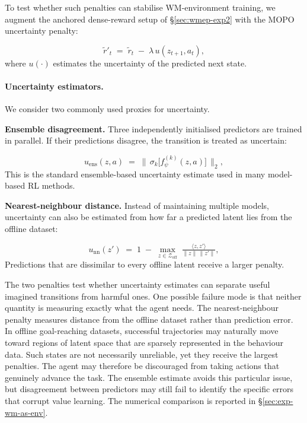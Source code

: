 To test whether such penalties can stabilise WM-environment training,
we augment the anchored dense-reward setup of
\S\ref{sec:wmep-exp2} with the MOPO uncertainty penalty:

\begin{equation}
    \tilde r'_t \;=\; \tilde r_t \;-\; \lambda\, u(z_{t+1}, a_t),
    \label{eq:wmep-mopo-reward}
\end{equation}
where $u(\cdot)$ estimates the uncertainty of the predicted next state.

\paragraph{Uncertainty estimators.}

We consider two commonly used proxies for uncertainty.

\textbf{Ensemble disagreement.}
Three independently initialised predictors are trained in parallel. If
their predictions disagree, the transition is treated as uncertain:

\begin{equation}
    u_{\text{ens}}(z, a) \;=\; \Big\|\,\sigma_k\!\big[f_\psi^{(k)}(z, a)\big]\,\Big\|_2,
    \label{eq:wmep-mopo-ens}
\end{equation}
This is the standard ensemble-based uncertainty estimate used in many
model-based RL methods.

\medskip

\textbf{Nearest-neighbour distance.}
Instead of maintaining multiple models, uncertainty can also be
estimated from how far a predicted latent lies from the offline
dataset:

\begin{equation}
    u_{\text{nn}}(z') \;=\; 1 \;-\; \max_{z\in\mathcal{Z}_{\text{off}}}\;
        \tfrac{\langle z, z'\rangle}{\|z\|\,\|z'\|},
    \label{eq:wmep-mopo-nn}
\end{equation}
Predictions that are dissimilar to every offline latent receive a
larger penalty.

The two penalties test whether uncertainty estimates can separate useful imagined
transitions from harmful ones. One possible failure mode is that neither quantity is measuring exactly
what the agent needs. The nearest-neighbour penalty measures distance
from the offline dataset rather than prediction error. In offline
goal-reaching datasets, successful trajectories may naturally move
toward regions of latent space that are sparsely represented in the
behaviour data. Such states are not necessarily unreliable, yet they
receive the largest penalties. The agent may therefore be discouraged
from taking actions that genuinely advance the task.
The ensemble estimate avoids this particular issue, but disagreement between
predictors may still fail to identify the specific errors that corrupt value
learning. The numerical comparison is reported in \S\ref{sec:exp-wm-as-env}.

